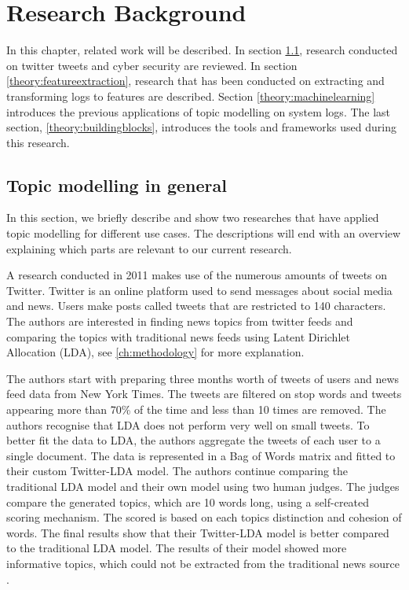\chapter{Research Background}  \label{ch:theory}

\begin{comment}
\section{definitions}
\end{comment}

In this chapter, related work will be described. In section \ref{theory:relatedwork}, research conducted on twitter tweets and cyber security are reviewed. In section \ref{theory:featureextraction}, research that has been conducted on extracting and transforming logs to features are described. Section \ref{theory:machinelearning} introduces the previous applications of topic modelling on system logs. The last section, \ref{theory:buildingblocks}, introduces the tools and frameworks used during this research.

\section{Topic modelling in general} \label{theory:relatedwork}
In this section, we briefly describe and show two researches that have applied topic modelling for different use cases. The descriptions will end with an overview explaining which parts are relevant to our current research. \par

\setlength{\parindent}{3ex} A research conducted in 2011 makes use of the numerous amounts of tweets on Twitter. Twitter is an online platform used to send messages about social media and news. Users make posts called tweets that are restricted to 140 characters. The authors are interested in finding news topics from twitter feeds and comparing the topics with traditional news feeds using Latent Dirichlet Allocation (LDA), see \ref{ch:methodology} for more explanation.

The authors start with preparing three months worth of tweets of users and news feed data from New York Times. The tweets are filtered on stop words and tweets appearing more than 70\% of the time and less than 10 times are removed. The authors recognise that LDA does not perform very well on small tweets. To better fit the data to LDA, the authors aggregate the tweets of each user to a single document. The data is represented in a Bag of Words matrix and fitted to their custom Twitter-LDA model. The authors continue comparing the traditional LDA model and their own model using two human judges. The judges compare the generated topics, which are 10 words long, using a self-created scoring mechanism. The scored is based on each topics distinction and cohesion of words. The final results show that their Twitter-LDA model is better compared to the traditional LDA model. The results of their model showed more informative topics, which could not be extracted from the traditional news source \cite{Zhao2011ComparingModels}. 

